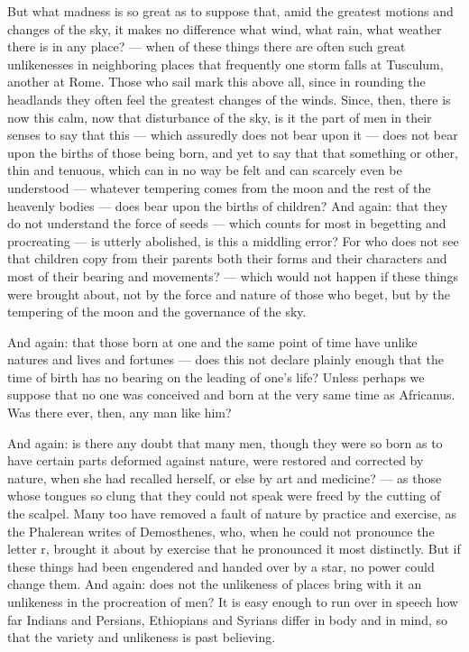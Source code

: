  But what madness is so great as to suppose that, amid the greatest motions and changes of the sky, it makes no difference what wind, what rain, what weather there is in any place? — when of these things there are often such great unlikenesses in neighboring places that frequently one storm falls at Tusculum, another at Rome. Those who sail mark this above all, since in rounding the headlands they often feel the greatest changes of the winds. Since, then, there is now this calm, now that disturbance of the sky, is it the part of men in their senses to say that this — which assuredly does not bear upon it — does not bear upon the births of those being born, and yet to say that that something or other, thin and tenuous, which can in no way be felt and can scarcely even be understood — whatever tempering comes from the moon and the rest of the heavenly bodies — does bear upon the births of children? And again: that they do not understand the force of seeds — which counts for most in begetting and procreating — is utterly abolished, is this a middling error? For who does not see that children copy from their parents both their forms and their characters and most of their bearing and movements? — which would not happen if these things were brought about, not by the force and nature of those who beget, but by the tempering of the moon and the governance of the sky.

 And again: that those born at one and the same point of time have unlike natures and lives and fortunes — does this not declare plainly enough that the time of birth has no bearing on the leading of one's life? Unless perhaps we suppose that no one was conceived and born at the very same time as Africanus. Was there ever, then, any man like him?

 And again: is there any doubt that many men, though they were so born as to have certain parts deformed against nature, were restored and corrected by nature, when she had recalled herself, or else by art and medicine? — as those whose tongues so clung that they could not speak were freed by the cutting of the scalpel. Many too have removed a fault of nature by practice and exercise, as the Phalerean writes of Demosthenes, who, when he could not pronounce the letter r, brought it about by exercise that he pronounced it most distinctly. But if these things had been engendered and handed over by a star, no power could change them. And again: does not the unlikeness of places bring with it an unlikeness in the procreation of men? It is easy enough to run over in speech how far Indians and Persians, Ethiopians and Syrians differ in body and in mind, so that the variety and unlikeness is past believing.

